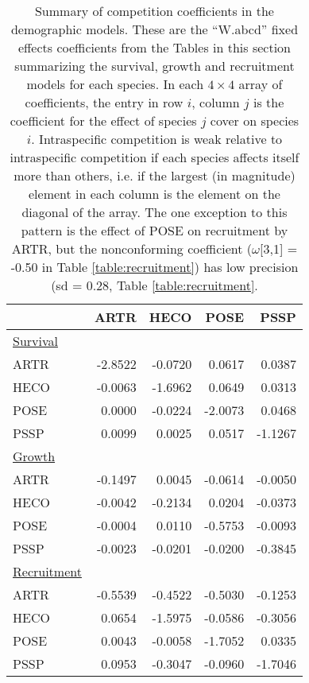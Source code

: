 \documentclass[11pt]{article}
\begin{document}
\newpage 
\begin{table}[ht]
\centering
\caption{Summary of competition coefficients in the demographic models. These are the ``W.abcd'' fixed effects coefficients from
the Tables in this section summarizing the survival, growth and recruitment models for each species.  
In each $4 \times 4$ array of coefficients, the entry in row $i$, column $j$ is the 
coefficient for the effect of species $j$ cover on species $i$. Intraspecific competition is weak relative to intraspecific competition if each
species affects itself more than others, i.e. if the largest (in magnitude) element in each column is the element on the diagonal of the array.
The one exception to this pattern is the effect of POSE on recruitment by ARTR, but the nonconforming
coefficient ($\omega$[3,1] = -0.50 in Table \ref{table:recruitment}) has low precision (sd = 0.28, Table \ref{table:recruitment}.} 
\label{table:alphas}
\begin{tabular}{lrrrr}
       & ARTR &  HECO &  POSE &  PSSP \\
\hline 
\underline{Survival} & & & & \\        
ARTR & -2.8522 & -0.0720 & 0.0617 & 0.0387\\
HECO & -0.0063 & -1.6962 & 0.0649 & 0.0313\\
POSE & 0.0000 & -0.0224 & -2.0073 & 0.0468\\
PSSP & 0.0099 & 0.0025 & 0.0517 & -1.1267\\
\underline{Growth} & & & & \\ 
ARTR & -0.1497 & 0.0045 & -0.0614 & -0.0050\\
HECO & -0.0042 & -0.2134 & 0.0204 & -0.0373\\
POSE & -0.0004 & 0.0110 & -0.5753 & -0.0093\\
PSSP & -0.0023 & -0.0201 & -0.0200 & -0.3845\\
\underline{Recruitment} & & & & \\ 
ARTR & -0.5539 & -0.4522 & -0.5030 & -0.1253\\
HECO &  0.0654 & -1.5975 & -0.0586 & -0.3056\\
POSE & 0.0043 & -0.0058 & -1.7052 & 0.0335\\
PSSP & 0.0953 & -0.3047 & -0.0960 & -1.7046\\
\hline
\end{tabular}
\end{table}

\clearpage

\renewcommand{\theequation}{C-\arabic{equation}}
\renewcommand{\thetable}{C-\arabic{table}}
\renewcommand{\thefigure}{C-\arabic{figure}}
\end{document}
